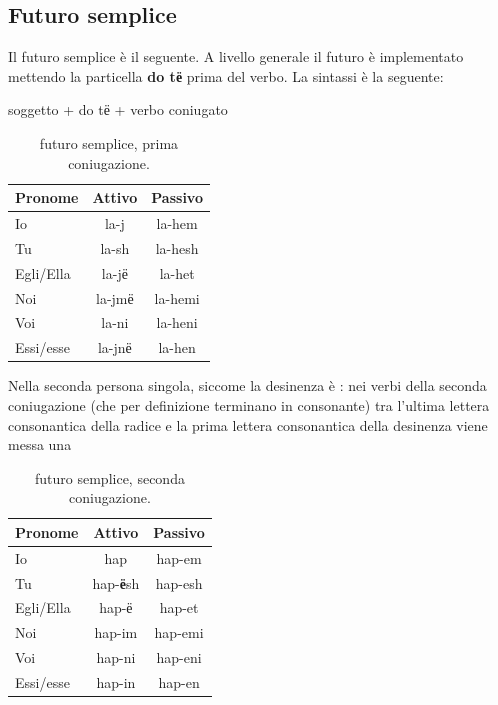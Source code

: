 \subsection{Futuro semplice}

Il futuro semplice\cite{vocedellaquila:futurosemplice} è il seguente. A livello generale il futuro è implementato mettendo la particella \textbf{do tё} prima del verbo. La sintassi è la seguente:

\begin{center}
    soggetto + do tё + verbo coniugato
\end{center}

\begin{table}[H]
    \centering
    \begin{tabular}{lcc}
        \toprule
        Pronome     &   Attivo & Passivo \\
        \midrule
        Io          &   la-j & la-hem \\
        Tu          &   la-sh & la-hesh \\
        Egli/Ella   &   la-jё & la-het \\
        Noi         &   la-jmё & la-hemi \\
        Voi         &   la-ni & la-heni \\
        Essi/esse   &   la-jnё & la-hen \\
        \bottomrule
    \end{tabular}
    \caption{futuro semplice, prima coniugazione.}
    \label{tbl:verb:primaconiugazione:futurosemplice}
\end{table}

Nella seconda persona singola, siccome la desinenza è : nei verbi della seconda coniugazione (che per definizione terminano in consonante) tra l'ultima lettera consonantica della radice e la prima lettera consonantica della desinenza viene messa una 

\begin{table}[H]
    \centering
    \begin{tabular}{lcc}
        \toprule
        Pronome     &   Attivo & Passivo \\
        \midrule
        Io          &   hap & hap-em \\
        Tu          &   hap-\textbf{ё}sh & hap-esh \\
        Egli/Ella   &   hap-ё & hap-et \\
        Noi         &   hap-im & hap-emi \\
        Voi         &   hap-ni & hap-eni \\
        Essi/esse   &   hap-in & hap-en \\
        \bottomrule
    \end{tabular}
    \caption{futuro semplice, seconda coniugazione.}
    \label{tbl:verb:primaconiugazione:futurosemplice}
\end{table}


